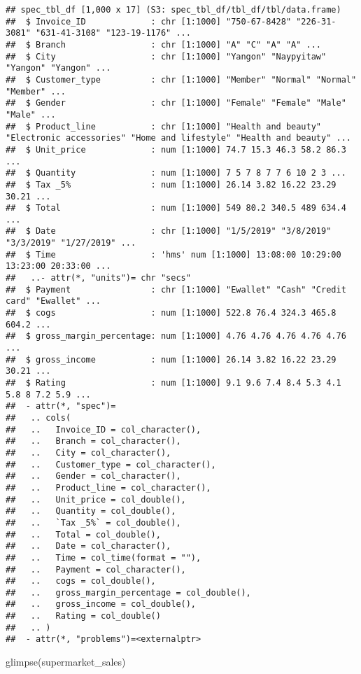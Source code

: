 \documentclass[
]{article}
\newenvironment{Shaded}{\begin{snugshade}}{\end{snugshade}}
\newcommand{\FunctionTok}[1]{\textcolor[rgb]{0.00,0.00,0.00}{#1}}
\newcommand{\NormalTok}[1]{#1}
\begin{document}
\begin{verbatim}
## spec_tbl_df [1,000 x 17] (S3: spec_tbl_df/tbl_df/tbl/data.frame)
##  $ Invoice_ID             : chr [1:1000] "750-67-8428" "226-31-3081" "631-41-3108" "123-19-1176" ...
##  $ Branch                 : chr [1:1000] "A" "C" "A" "A" ...
##  $ City                   : chr [1:1000] "Yangon" "Naypyitaw" "Yangon" "Yangon" ...
##  $ Customer_type          : chr [1:1000] "Member" "Normal" "Normal" "Member" ...
##  $ Gender                 : chr [1:1000] "Female" "Female" "Male" "Male" ...
##  $ Product_line           : chr [1:1000] "Health and beauty" "Electronic accessories" "Home and lifestyle" "Health and beauty" ...
##  $ Unit_price             : num [1:1000] 74.7 15.3 46.3 58.2 86.3 ...
##  $ Quantity               : num [1:1000] 7 5 7 8 7 7 6 10 2 3 ...
##  $ Tax _5%                : num [1:1000] 26.14 3.82 16.22 23.29 30.21 ...
##  $ Total                  : num [1:1000] 549 80.2 340.5 489 634.4 ...
##  $ Date                   : chr [1:1000] "1/5/2019" "3/8/2019" "3/3/2019" "1/27/2019" ...
##  $ Time                   : 'hms' num [1:1000] 13:08:00 10:29:00 13:23:00 20:33:00 ...
##   ..- attr(*, "units")= chr "secs"
##  $ Payment                : chr [1:1000] "Ewallet" "Cash" "Credit card" "Ewallet" ...
##  $ cogs                   : num [1:1000] 522.8 76.4 324.3 465.8 604.2 ...
##  $ gross_margin_percentage: num [1:1000] 4.76 4.76 4.76 4.76 4.76 ...
##  $ gross_income           : num [1:1000] 26.14 3.82 16.22 23.29 30.21 ...
##  $ Rating                 : num [1:1000] 9.1 9.6 7.4 8.4 5.3 4.1 5.8 8 7.2 5.9 ...
##  - attr(*, "spec")=
##   .. cols(
##   ..   Invoice_ID = col_character(),
##   ..   Branch = col_character(),
##   ..   City = col_character(),
##   ..   Customer_type = col_character(),
##   ..   Gender = col_character(),
##   ..   Product_line = col_character(),
##   ..   Unit_price = col_double(),
##   ..   Quantity = col_double(),
##   ..   `Tax _5%` = col_double(),
##   ..   Total = col_double(),
##   ..   Date = col_character(),
##   ..   Time = col_time(format = ""),
##   ..   Payment = col_character(),
##   ..   cogs = col_double(),
##   ..   gross_margin_percentage = col_double(),
##   ..   gross_income = col_double(),
##   ..   Rating = col_double()
##   .. )
##  - attr(*, "problems")=<externalptr>
\end{verbatim}

\begin{Shaded}
\begin{Highlighting}[]
\FunctionTok{glimpse}\NormalTok{(supermarket\_sales)}
\end{Highlighting}
\end{Shaded}
\end{document}
